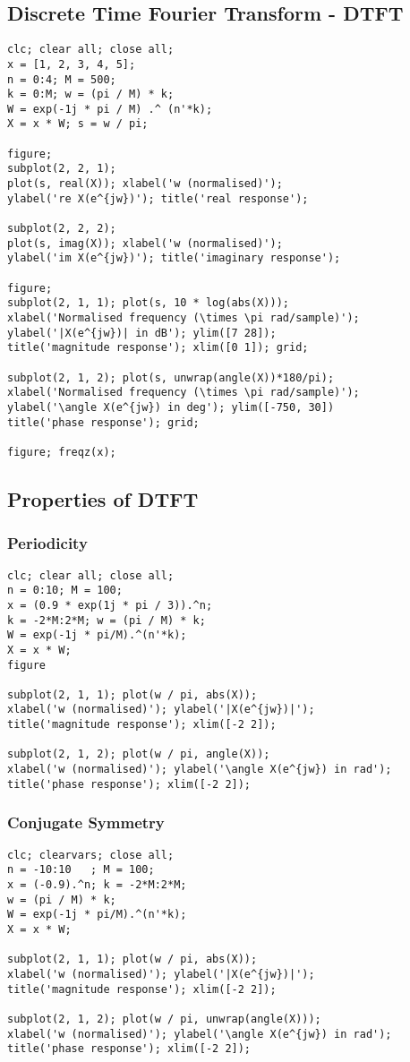 \documentclass[12pt]{article}
\begin{document}
\subsection{Discrete Time Fourier Transform - DTFT}
\begin{verbatim}
clc; clear all; close all;
x = [1, 2, 3, 4, 5];
n = 0:4; M = 500;
k = 0:M; w = (pi / M) * k;
W = exp(-1j * pi / M) .^ (n'*k);
X = x * W; s = w / pi;

figure;
subplot(2, 2, 1);
plot(s, real(X)); xlabel('w (normalised)');
ylabel('re X(e^{jw})'); title('real response');

subplot(2, 2, 2);
plot(s, imag(X)); xlabel('w (normalised)');
ylabel('im X(e^{jw})'); title('imaginary response');

figure;
subplot(2, 1, 1); plot(s, 10 * log(abs(X)));
xlabel('Normalised frequency (\times \pi rad/sample)');
ylabel('|X(e^{jw})| in dB'); ylim([7 28]); 
title('magnitude response'); xlim([0 1]); grid; 

subplot(2, 1, 2); plot(s, unwrap(angle(X))*180/pi);
xlabel('Normalised frequency (\times \pi rad/sample)');
ylabel('\angle X(e^{jw}) in deg'); ylim([-750, 30])
title('phase response'); grid;

figure; freqz(x);
\end{verbatim}

\subsection{Properties of DTFT}
\subsubsection{Periodicity}
\begin{verbatim}
clc; clear all; close all;
n = 0:10; M = 100;
x = (0.9 * exp(1j * pi / 3)).^n; 
k = -2*M:2*M; w = (pi / M) * k;
W = exp(-1j * pi/M).^(n'*k);
X = x * W;
figure

subplot(2, 1, 1); plot(w / pi, abs(X));
xlabel('w (normalised)'); ylabel('|X(e^{jw})|');
title('magnitude response'); xlim([-2 2]);

subplot(2, 1, 2); plot(w / pi, angle(X));
xlabel('w (normalised)'); ylabel('\angle X(e^{jw}) in rad');
title('phase response'); xlim([-2 2]);
\end{verbatim}

\subsubsection{Conjugate Symmetry}
\begin{verbatim}
clc; clearvars; close all;
n = -10:10   ; M = 100;
x = (-0.9).^n; k = -2*M:2*M;
w = (pi / M) * k;
W = exp(-1j * pi/M).^(n'*k);
X = x * W;

subplot(2, 1, 1); plot(w / pi, abs(X));
xlabel('w (normalised)'); ylabel('|X(e^{jw})|');
title('magnitude response'); xlim([-2 2]);

subplot(2, 1, 2); plot(w / pi, unwrap(angle(X)));
xlabel('w (normalised)'); ylabel('\angle X(e^{jw}) in rad');
title('phase response'); xlim([-2 2]);
\end{verbatim}
\end{document}
